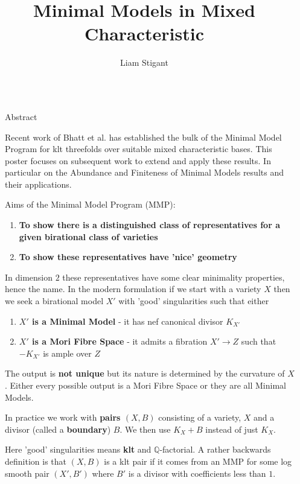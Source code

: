 \documentclass[final]{beamer}
\title{Minimal Models in Mixed Characteristic}
\author{Liam Stigant}
\institute[shortinst]{Imperial College London}
\newlength{\sepwidth}
\newcommand{\separatorcolumn}{\begin{column}{\sepwidth}\end{column}}
\begin{document}
	
	\begin{frame}[t, fragile]
	\begin{columns}[t]
		\separatorcolumn
		
		\begin{column}{0.14\paperwidth}
			
			\begin{block}{Abstract}
				
				Recent work of Bhatt et al.\cite{bhatt2020} has established the bulk of the Minimal Model Program for klt threefolds over suitable mixed characteristic bases. This poster focuses on subsequent work to extend and apply these results. In particular on the Abundance and Finiteness of Minimal Models results and their applications.
				
			\end{block}
			
			\begin{block}{Aims of the Minimal Model Program (MMP):}
				\begin{enumerate}
					\item \textbf{To show there is a distinguished class of representatives for a given birational class of varieties}
					\item \textbf{To show these representatives have 'nice' geometry}
				\end{enumerate}
				
				In dimension $2$ these representatives have some clear minimality properties, hence the name. In the modern formulation if we start with a variety $X$ then we seek a birational model $X'$ with 'good' singularities such that either  
				\begin{enumerate}
					\item \textbf{$X'$ is a Minimal Model} - it has nef canonical divisor $K_{X'}$
					\item \textbf{$X'$ is a Mori Fibre Space} - it admits a fibration $X' \to  Z$ such that $-K_{X'}$ is ample over $Z$ 
				\end{enumerate}
				
				The output is \textbf{not unique} but its nature is determined by the curvature of $X$. Either every possible output is a Mori Fibre Space or they are all Minimal Models.
				
				In practice we work with \textbf{pairs $(X,B)$} consisting of a variety, $X$ and a divisor (called a \textbf{boundary}) $B$. We then use $K_{X}+B$ instead of just $K_{X}$.
				
				Here 'good' singularities means \textbf{klt} and $\mathbb{Q}$-factorial. A rather backwards definition is that $(X,B)$ is a klt pair if it comes from an MMP for some log smooth pair $(X',B')$ where $B'$ is a divisor with coefficients less than $1$.
			\end{block}
			

\end{column}
\end{columns}
\end{frame}
\end{document}
